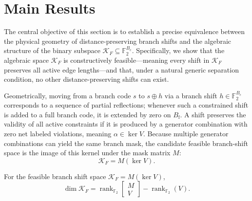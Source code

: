 \section{Main Results}
\label{sec:results}

The central objective of this section is to establish a precise equivalence between the physical geometry of distance-preserving branch shifts and the algebraic structure of the binary subspace $\mathcal{K}_F \subseteq \mathbb{F}_2^{B_{\mathrm{c}}}$. Specifically, we show that the algebraic space $\mathcal{K}_F$ is constructively feasible—meaning every shift in $\mathcal{K}_F$ preserves all active edge lengths—and that, under a natural generic separation condition, no other distance-preserving shifts can exist.

Geometrically, moving from a branch code $s$ to $s \oplus h$ via a branch shift $h \in \mathbb{F}_2^{B_{\mathrm{c}}}$ corresponds to a sequence of partial reflections; whenever such a constrained shift is added to a full branch code, it is extended by zero on $B_{\mathrm{f}}$. A shift preserves the validity of all active constraints if it is produced by a generator combination with zero net labeled violations, meaning $\alpha \in \ker V$. Because multiple generator combinations can yield the same branch mask, the candidate feasible branch-shift space is the image of this kernel under the mask matrix $M$:
\[
\mathcal{K}_F = M(\ker V).
\]

\begin{lemma}
\label{lem:rank}
For the feasible branch shift space $\mathcal{K}_F = M(\ker V)$,
\[
\dim \mathcal{K}_F
=
\operatorname{rank}_{\mathbb{F}_2}\begin{bmatrix} M \\ V \end{bmatrix}
-
\operatorname{rank}_{\mathbb{F}_2}(V).
\]
\end{lemma}

